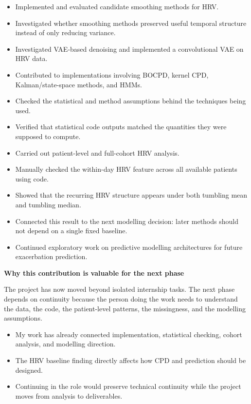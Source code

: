 \documentclass[10pt,a4paper]{article}
\begin{document}
\begin{itemize}
    \item Implemented and evaluated candidate smoothing methods for HRV.
    \item Investigated whether smoothing methods preserved useful temporal structure instead of only reducing variance.
    \item Investigated VAE-based denoising and implemented a convolutional VAE on HRV data.
    \item Contributed to implementations involving BOCPD, kernel CPD, Kalman/state-space methods, and HMMs.
    \item Checked the statistical and method assumptions behind the techniques being used.
    \item Verified that statistical code outputs matched the quantities they were supposed to compute.
    \item Carried out patient-level and full-cohort HRV analysis.
    \item Manually checked the within-day HRV feature across all available patients using code.
    \item Showed that the recurring HRV structure appears under both tumbling mean and tumbling median.
    \item Connected this result to the next modelling decision: later methods should not depend on a single fixed baseline.
    \item Continued exploratory work on predictive modelling architectures for future exacerbation prediction.
\end{itemize}

\textbf{Why this contribution is valuable for the next phase}

The project has now moved beyond isolated internship tasks. The next phase depends on continuity because the person doing the work needs to understand the data, the code, the patient-level patterns, the missingness, and the modelling assumptions.

\begin{itemize}
    \item My work has already connected implementation, statistical checking, cohort analysis, and modelling direction.
    \item The HRV baseline finding directly affects how CPD and prediction should be designed.
    \item Continuing in the role would preserve technical continuity while the project moves from analysis to deliverables.
\end{itemize}
\end{document}
